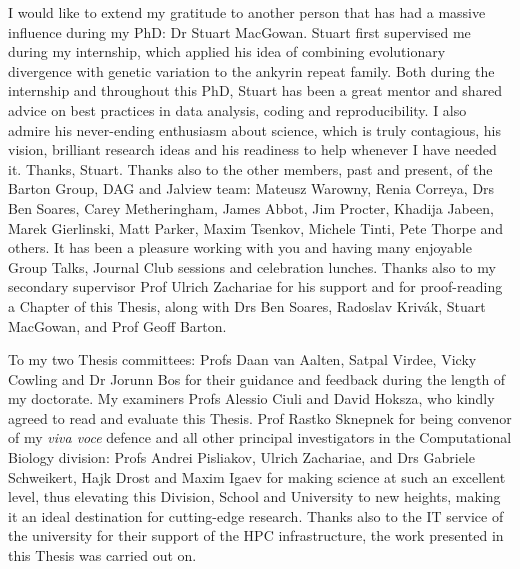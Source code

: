 I would like to extend my gratitude to another person that has had a massive influence during my PhD: Dr Stuart MacGowan. Stuart first supervised me during my internship, which applied his idea of combining evolutionary divergence with genetic variation to the ankyrin repeat family. Both during the internship and throughout this PhD, Stuart has been a great mentor and shared advice on best practices in data analysis, coding and reproducibility. I also admire his never-ending enthusiasm about science, which is truly contagious, his vision, brilliant research ideas and his readiness to help whenever I have needed it. Thanks, Stuart. Thanks also to the other members, past and present, of the Barton Group, DAG and Jalview team: Mateusz Warowny, Renia Correya, Drs Ben Soares, Carey Metheringham, James Abbot, Jim Procter, Khadija Jabeen, Marek Gierlinski, Matt Parker, Maxim Tsenkov, Michele Tinti, Pete Thorpe and others. It has been a pleasure working with you and having many enjoyable Group Talks, Journal Club sessions and celebration lunches. Thanks also to my secondary supervisor Prof Ulrich Zachariae for his support and for proof-reading a Chapter of this Thesis, along with Drs Ben Soares, Radoslav Krivák, Stuart MacGowan, and Prof Geoff Barton.

To my two Thesis committees: Profs Daan van Aalten, Satpal Virdee, Vicky Cowling and Dr Jorunn Bos for their guidance and feedback during the length of my doctorate. My examiners Profs Alessio Ciuli and David Hoksza, who kindly agreed to read and evaluate this Thesis. Prof Rastko Sknepnek for being convenor of my \textit{viva voce} defence and all other principal investigators in the Computational Biology division: Profs Andrei Pisliakov, Ulrich Zachariae, and Drs Gabriele Schweikert, Hajk Drost and Maxim Igaev for making science at such an excellent level, thus elevating this Division, School and University to new heights, making it an ideal destination for cutting-edge research. Thanks also to the IT service of the university for their support of the HPC infrastructure, the work presented in this Thesis was carried out on.

